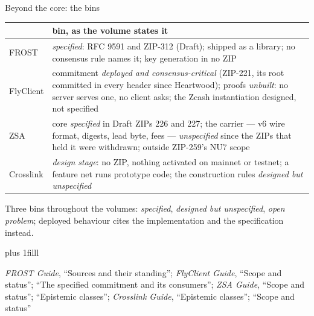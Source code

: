\documentclass[aspectratio=169,11pt]{beamer}
\newcommand{\src}[1]{\par\vskip0pt plus 1filll
  {\fontsize{6}{7.2}\selectfont\color{arbdim}\raggedright #1\par}}
\begin{document}
\begin{frame}{Beyond the core: the bins}
\begin{center}\small
\begin{tabular}{@{}p{}p{}@{}}
\toprule
 & bin, as the volume states it \\
\midrule
FROST & \emph{specified}: RFC 9591 and ZIP-312 (Draft); shipped as a
  library; no consensus rule names it; key generation in no ZIP \\
\addlinespace
FlyClient & commitment \emph{deployed and consensus-critical} (ZIP-221,
  its root committed in every header since Heartwood); proofs
  \emph{unbuilt}: no server serves one, no client asks; the Zcash
  instantiation designed, not specified \\
\addlinespace
ZSA & core \emph{specified} in Draft ZIPs 226 and 227; the carrier ---
  v6 wire format, digests, lead byte, fees --- \emph{unspecified} since
  the ZIPs that held it were withdrawn; outside ZIP-259's NU7 scope \\
\addlinespace
Crosslink & \emph{design stage}: no ZIP, nothing activated on mainnet or
  testnet; a feature net runs prototype code; the construction rules
  \emph{designed but unspecified} \\
\bottomrule
\end{tabular}
\end{center}
Three bins throughout the volumes: \emph{specified}, \emph{designed but
unspecified}, \emph{open problem}; deployed behaviour cites the
implementation and the specification instead.
\src{\emph{FROST Guide}, ``Sources and their standing''; \emph{FlyClient Guide},
``Scope and status''; ``The specified commitment and its consumers''; \emph{ZSA
Guide}, ``Scope and status''; ``Epistemic classes''; \emph{Crosslink Guide},
``Epistemic classes''; ``Scope and status''}
\end{frame}
\end{document}
